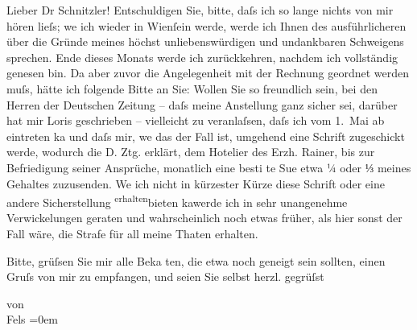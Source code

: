 \pstart\center{}Lieber Dr Schnitzler!\pend\vspace{0.5em}
\pstart
           Entschuldigen Sie, bitte, daſs ich so lange nichts von mir hören lieſs; we{\geminationn} ich wieder in Wienſein werde, werde ich Ihnen des
                    ausführlicheren über die Gründe meines höchst unliebenswürdigen und undankbaren
                    Schweigens sprechen. Ende dieses Monats werde ich zurückkehren, nachdem ich
                    vollständig genesen bin. Da aber zuvor die Angelegenheit mit der Rechnung
                    geordnet werden muſs, hätte ich folgende Bitte an Sie: Wollen Sie so freundlich
                    sein, bei den Herren der Deutschen Zeitung –
                    daſs meine Anstellung ganz sicher sei, darüber hat mir Loris geschrieben – vielleicht zu veranlaſsen, daſs ich
                    vom 1. Mai ab eintreten ka{\geminationn} und  daſs mir, we{\geminationn}
                    das der Fall ist, umgehend eine Schrift zugeschickt werde, wodurch die D. Ztg. erklärt, dem Hotelier des Erzh. Rainer, bis zur Befriedigung seiner Ansprüche,
                    monatlich eine besti {\geminationm} te Su{\geminationm}e etwa ¼ \introOben{}oder ⅓\introOben{} meines
                    Gehaltes zuzusenden. We{\geminationn} ich nicht in kürzester
                    Kürze diese Schrift oder eine andere Sicherstellung \substVorne{}\textsuperscript{erhalten}\substDazwischen{}bieten ka{\geminationn}\substHinten{}{ }{\pb}werde ich in sehr unangenehme Verwickelungen
                    geraten und wahrscheinlich noch etwas früher, als hier sonst der Fall wäre, die
                    Strafe für all meine Thaten erhalten.\pend
           
\pstart
           Bitte, grüſsen Sie mir alle Beka{\geminationn} ten, die etwa
                    noch geneigt sein sollten, einen Gruſs von mir zu empfangen, und seien Sie
                    selbst herzl. gegrüſst\pend
           
\pstart
           von {\\[\baselineskip]}\spacefill\mbox{Fels}\pend
           \leftskip=0em{}\endnumbering{}  \newcommand{\dateiname}{L00198}\newcommand{\titel}{Friedrich M. Fels an Arthur Schnitzler, 20. 4. 1893}\newcommand{\editorInnen}{Martin Anton Müller und Gerd-Hermann Susen}
